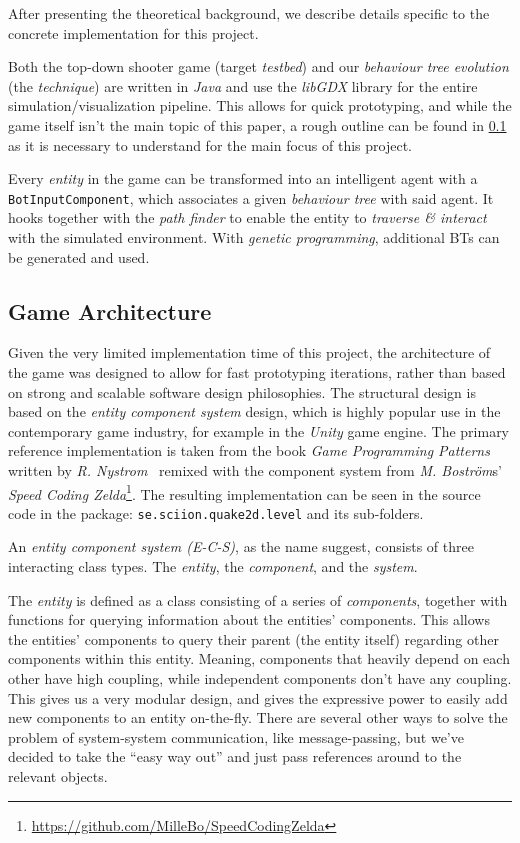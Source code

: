 \documentclass[a4paper, twocolumn]{article}
\begin{document}
        After presenting the theoretical background, we describe details specific to the concrete implementation for this project.

        Both the top-down shooter game (target \emph{testbed}) and our \emph{behaviour tree evolution} (the \emph{technique}) are written in \emph{Java} and use the \emph{libGDX} library for the entire simulation/visualization pipeline. This allows for quick prototyping, and while the game itself isn't the main topic of this paper, a rough outline can be found in \cref{sec:game_architecture} as it is necessary to understand for the main focus of this project.

        Every \emph{entity} in the game can be transformed into an intelligent agent with a \texttt{BotInputComponent}, which associates a given \emph{behaviour tree} with said agent. It hooks together with the \emph{path finder} to enable the entity to \emph{traverse \& interact} with the simulated environment. With \emph{genetic programming}, additional BTs can be generated and used.

        \subsection{Game Architecture} \label{sec:game_architecture}

        Given the very limited implementation time of this project, the architecture of the game was designed to allow for fast prototyping iterations, rather than based on strong and scalable software design philosophies. The structural design is based on the \textit{entity component system} design, which is highly popular use in the contemporary game industry, for example in the \textit{Unity} game engine. The primary reference implementation is taken from the book \textit{Game Programming Patterns} written by \textit{R. Nystrom}~\cite{nystrom2014game} remixed with the component system from \textit{M. Boström}s' \textit{Speed Coding Zelda}\footnote{\url{https://github.com/MilleBo/SpeedCodingZelda}}. The resulting implementation can be seen in the source code in the package: \texttt{se.sciion.quake2d.level} and its sub-folders.

        An \textit{entity component system (E-C-S)}, as the name suggest, consists of three interacting class types. The \textit{entity}, the \textit{component}, and the \textit{system}.

        The \emph{entity} is defined as a class consisting of a series of \emph{components}, together with functions for querying information about the entities' components. This allows the entities' components to query their parent (the entity itself) regarding other components within this entity. Meaning, components that heavily depend on each other have high coupling, while independent components don't have any coupling. This gives us a very modular design, and gives the expressive power to easily add new components to an entity on-the-fly. There are several other ways to solve the problem of system-system communication, like message-passing, but we've decided to take the ``easy way out'' and just pass references around to the relevant objects.
\end{document}
